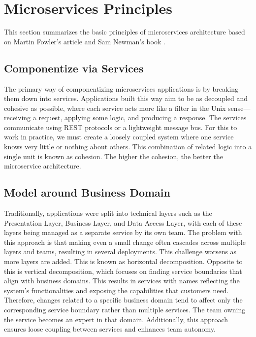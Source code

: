 \section{Microservices Principles}
This section summarizes the basic principles of microservices architecture based on Martin Fowler's article \cite{Fowler} and Sam Newman's book \cite{NewmanBuildingMs}.

\subsection{Componentize via Services}
The primary way of componentizing microservices applications is by breaking them down into services. Applications built this way aim to be as decoupled and cohesive as possible, where each service acts more like a filter in the Unix sense—receiving a request, applying some logic, and producing a response. The services communicate using REST protocols or a lightweight message bus. For this to work in practice, we must create a loosely coupled system where one service knows very little or nothing about others. This combination of related logic into a single unit is known as cohesion. The higher the cohesion, the better the microservice architecture.

\subsection{Model around Business Domain}
Traditionally, applications were split into technical layers such as the Presentation Layer, Business Layer, and Data Access Layer, with each of these layers being managed as a separate service by its own team. The problem with this approach is that making even a small change often cascades across multiple layers and teams, resulting in several deployments. This challenge worsens as more layers are added. This is known as horizontal decomposition. Opposite to this is vertical decomposition, which focuses on finding service boundaries that align with business domains. This results in services with names reflecting the system’s functionalities and exposing the capabilities that customers need. Therefore, changes related to a specific business domain tend to affect only the corresponding service boundary rather than multiple services. The team owning the service becomes an expert in that domain. Additionally, this approach ensures loose coupling between services and enhances team autonomy.


